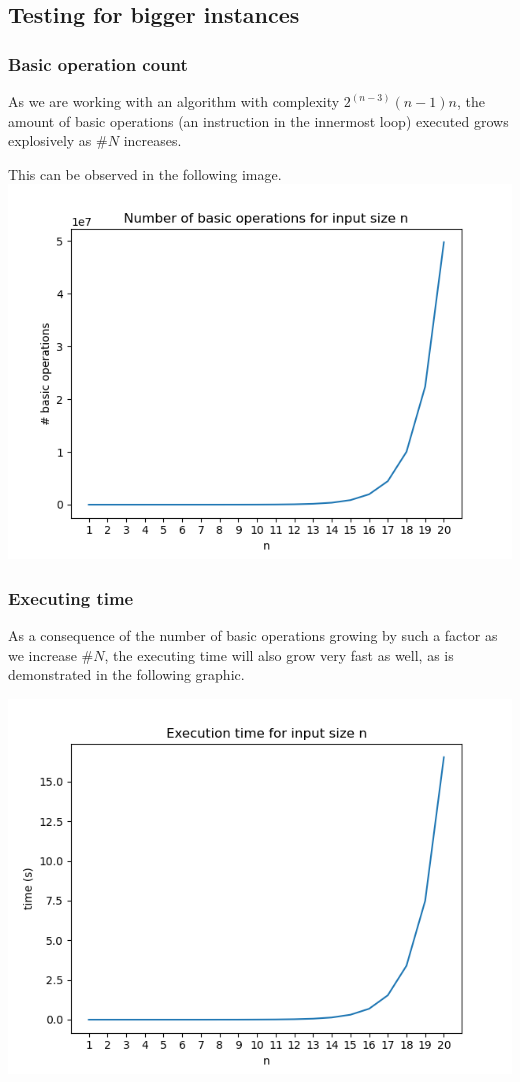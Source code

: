 \documentclass[...]{revdetua}
\begin{document}
\subsection{Testing for bigger instances}
\subsubsection{Basic operation count}
As we are working with an algorithm with complexity $2^{(n-3)}(n-1)n$, the amount of basic operations (an instruction in the innermost loop) executed grows explosively as $\#N$ increases.\par This can be observed in the following image.
\includegraphics[scale=0.5]{basic_ops.png}
\subsubsection{Executing time}
As a consequence of the number of basic operations growing by such a factor as we increase $\#N$, the executing time will also grow very fast as well, as is demonstrated in the following graphic.

\includegraphics[scale=0.5]{exe_time.png}
\end{document}
